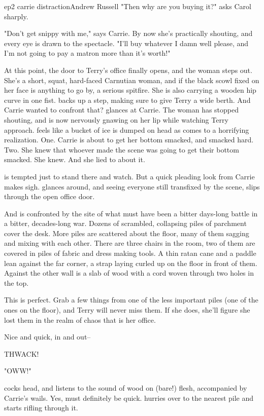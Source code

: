\documentclass{book}
\begin{document}
\begin{childnode}{ep2 carrie distraction}{Andrew Russell}
    "Then why are you buying it?" asks Carol sharply.

    "Don't get snippy with me," says Carrie. By now she's practically shouting, and every eye is drawn to the spectacle. "I'll buy whatever I damn well please, and I'm not going to pay a matron
    more than it's worth!"

    At this point, the door to Terry's office finally opens, and the woman steps out. She's a short, squat, hard-faced Carnutian woman, and if the black scowl fixed on her face is anything to go by,
    a 
    serious spitfire. She is also carrying a wooden hip curve in one fist. \name{} backs up a step, making sure to give Terry a wide berth. And Carrie wanted \himher{} to confront that? \name{}
    glances at Carrie. The woman has stopped shouting, and is now nervously gnawing on her lip while watching Terry approach. \name{} feels like a bucket of ice is dumped on \hisher{} head as 
    \heshe{} comes to a horrifying realization. One. Carrie is about to get her bottom smacked, and smacked hard. Two. She knew that whoever made the scene was going to get their bottom smacked.
    She knew. And she lied to \name{} about it.

    \name{} is tempted just to stand there and watch. But a quick pleading look from Carrie makes \himher{} sigh. \HeShe{} glances around, and seeing everyone still transfixed by the scene, slips 
    through the open office door.

    And is confronted by the site of what must have been a bitter days-long battle in a bitter, decades-long war. Dozens of scrambled, collapsing piles of parchment cover the desk. More piles are
    scattered about the floor, many of them sagging and mixing with each other. There are three chairs in the room, two of them are covered in piles of fabric and dress making tools. A thin ratan
    cane and a paddle lean against the far corner, a strap laying curled up on the floor in front of them. Against the other wall is a slab of wood with a cord woven through two holes in the top.

    This is perfect. Grab a few things from one of the less important piles (one of the ones on the floor), and Terry will never miss them. If she does, she'll figure she lost them in the realm
    of chaos that is her office.

    Nice and quick, in and out--

    THWACK! 

    "OWW!"

    \name{} cocks \hisher{} head, and listens to the sound of wood on (bare!) flesh, accompanied by Carrie's wails. Yes, must definitely be quick. \name{} hurries over to the nearest pile and 
    starts rifling through it.


\end{childnode}
\end{document}
